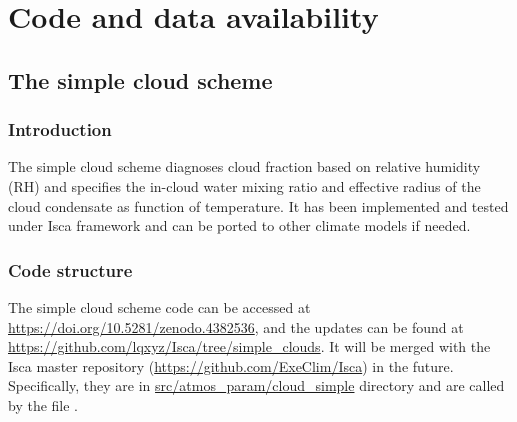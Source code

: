\chapter{Code and data availability}

\section{The simple cloud scheme}

\subsection{Introduction}
The simple cloud scheme diagnoses cloud fraction based on relative humidity (RH) and specifies the in-cloud water mixing ratio and effective radius of the cloud condensate as function of temperature. It has been implemented and tested under Isca framework \citep{Vallis2018} and can be ported to other climate models if needed.

\subsection{Code structure}

The simple cloud scheme code can be accessed at \url{https://doi.org/10.5281/zenodo.4382536}, and the updates can be found at \url{https://github.com/lqxyz/Isca/tree/simple_clouds}. It will be merged with the Isca master repository (\url{https://github.com/ExeClim/Isca}) in the future. Specifically, they are in \url{src/atmos\_param/cloud\_simple} directory and are called by the file .

